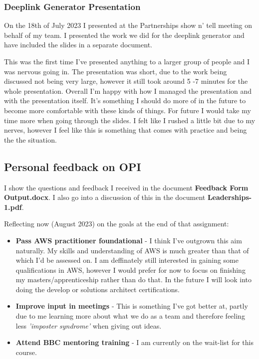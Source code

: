     \subsubsection{Deeplink Generator Presentation}
    On the 18th of July 2023 I presented at the Partnerships show n' tell meeting on behalf of my team. I presented the work we did for the
    deeplink generator and have included the slides in a separate document.

    This was the first time I've presented anything to a larger group of people and I was nervous going in. The presentation was short, due to the work
    being discussed not being very large, however it still took around 5 -7 minutes for the whole presentation. Overall I'm happy with how I managed the 
    presentation and with the presentation itself. It's something I should do more of in the future to become more comfortable with these kinds of things.
    For future I would take my time more when going through the slides. I felt like I rushed a little bit due to my nerves, however I feel like this is 
    something that comes with practice and being the the situation. 

  \subsection{Personal feedback on OPI}
  I show the questions and feedback I received in the document \textbf{Feedback Form Output.docx}. I also go into a discussion of this in the document
  \textbf{Leaderships-1.pdf}.

  Reflecting now (August 2023) on the goals at the end of that assignment:
  \begin{itemize}
    \item \textbf{Pass AWS practitioner foundational} - I think I've outgrown this aim naturally. My skills and understanding of AWS is much greater than
    that of which I'd be assessed on. I am deffinately still interested in gaining some qualifications in AWS, however I would prefer for now to focus on 
    finishing my masters/apprenticeship rather than do that. In the future I will look into doing the develop or solutions architect certifications.
    \item \textbf{Improve input in meetings} - This is something I've got better at, partly due to me learning more about what we do as a team and therefore
    feeling less \textit{'imposter syndrome'} when giving out ideas.
    \item \textbf{Attend BBC mentoring training} - I am currently on the wait-list for this course.
  \end{itemize}

\newpage
